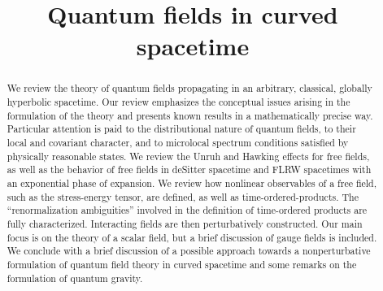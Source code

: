\documentclass[12pt]{article}
\theoremstyle{plain}
\theoremstyle{definition}
\begin{document}
%



\title{Quantum fields in curved spacetime}





\maketitle
\begin{abstract}

We review the theory of quantum fields propagating in an arbitrary, classical, globally hyperbolic spacetime. Our review emphasizes the conceptual issues arising in the formulation of the theory and presents known results in a mathematically precise way. Particular attention is paid to the distributional nature of quantum fields, to their local and covariant character, and to microlocal spectrum conditions satisfied by physically reasonable states. We review the Unruh and Hawking effects for free fields, as well as the behavior of free fields in deSitter spacetime and FLRW spacetimes with an exponential phase of expansion. We review how nonlinear observables of a free field, such as the stress-energy tensor, are defined, as well as time-ordered-products. The ``renormalization ambiguities'' involved in the definition of time-ordered products are fully characterized. Interacting fields are then perturbatively constructed. Our main focus is on the theory of a scalar field, but a brief discussion of gauge fields is included. We conclude with a brief discussion of a possible approach towards a nonperturbative formulation of quantum field theory in curved spacetime and some remarks on the formulation of quantum gravity.


\end{abstract}
\end{document}
